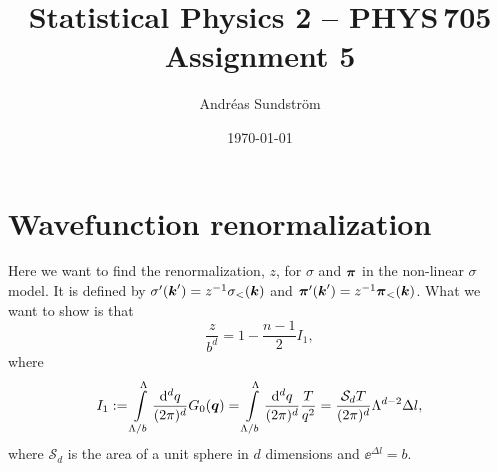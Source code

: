 \documentclass[11pt,letter, swedish, english
]{article}
\begin{document}




\title{Statistical Physics 2 -- PHYS\,705 \\
Assignment 5}
\author{Andréas Sundström}
\date{\today}

\maketitle


\section{Wavefunction renormalization}
Here we want to find the renormalization, $z$, for $\sigma$ and
$\vb*\pi$ in the non-linear $\sigma$ model. It is defined by 
$\sigma'(\vb*k') = z^{-1}\sigma_<(\vb*k)$ and
$\vb*\pi'(\vb*k') = z^{-1}\vb*\pi_<(\vb*k)$. What we want to show is
that
\begin{equation}\label{eq:1_want}
\frac{z}{b^{d}} = 1 -\frac{n-1}{2}I_1,
\end{equation}
where
\begin{equation}
I_1:= \int_{\Lambda/b}^\Lambda \frac{\rd^dq}{(2\pi)^d}G_0(\vb*q)
= \int_{\Lambda/b}^\Lambda \frac{\rd^dq}{(2\pi)^d} \frac{T}{q^2}
= \frac{\mathcal{S}_d T}{(2\pi)^d} \Lambda^{d-2} \Delta{l},
\end{equation}
where $\mathcal{S}_d$ is the area of a unit sphere in $d$ dimensions
and $\ee^{\Delta{l}} = b$.
\end{document}
